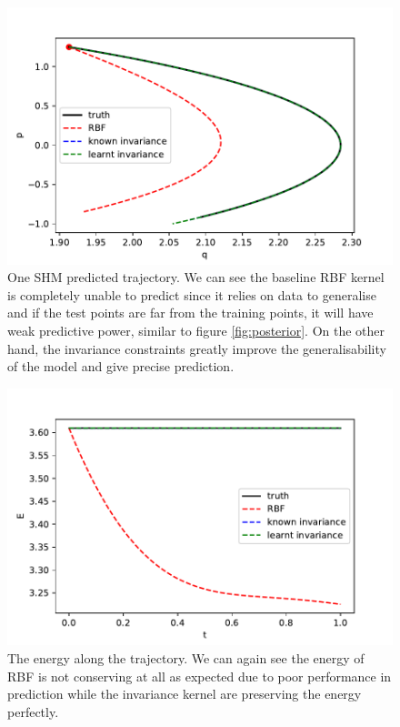 \documentclass{statsmsc}
\begin{document}
\begin{figure}[H]
        \centering
        \includegraphics[width=0.8\linewidth]{../codes/figures/shm_predicted.pdf}
        \caption{One SHM predicted trajectory. We can see the baseline RBF kernel is completely unable to predict since it relies on data to generalise and if the test points are far from the training points, it will have weak predictive power, similar to figure \ref{fig:posterior}. On the other hand, the invariance constraints greatly improve the generalisability of the model and give precise prediction.}
        \label{fig:shm_prediction}
\end{figure}

\begin{figure}[H] 
  \includegraphics[width=0.8\linewidth]{../codes/figures/shm_energy.pdf}
  \centering
  \caption{The energy along the trajectory. We can again see the energy of RBF is not conserving at all as expected due to poor performance in prediction while the invariance kernel are preserving the energy perfectly.}
  \label{fig:shm_energy}
\end{figure}
\end{document}
